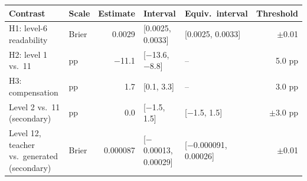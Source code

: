 \begin{tabular}{p{3.3cm}lrllr}
\toprule
Contrast & Scale & Estimate & Interval & Equiv.\ interval & Threshold \\
\midrule
H1: level-6 readability & Brier & 0.0029 & [0.0025, 0.0033] & [0.0025, 0.0033] & $\pm$0.01 \\
H2: level 1 vs.\ 11 & pp & \ensuremath{-}11.1 & [\ensuremath{-}13.6, \ensuremath{-}8.8] & -- & 5.0 pp \\
H3: compensation & pp & 1.7 & [0.1, 3.3] & -- & 3.0 pp \\
Level 2 vs.\ 11 (secondary) & pp & 0.0 & [\ensuremath{-}1.5, 1.5] & [\ensuremath{-}1.5, 1.5] & $\pm$3.0 pp \\
Level 12, teacher vs.\ generated (secondary) & Brier & 0.000087 & [\ensuremath{-}0.00013, 0.00029] & [\ensuremath{-}0.000091, 0.00026] & $\pm$0.01 \\
\bottomrule
\end{tabular}
